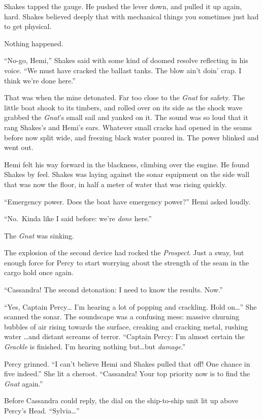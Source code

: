 \documentclass[
]{scrbook}
\begin{document}
Shakes tapped the gauge. He pushed the lever down, and pulled it up
again, hard. Shakes believed deeply that with mechanical things you
sometimes just had to get physical.

Nothing happened.

``No-go, Hemi,'' Shakes said with some kind of doomed resolve reflecting
in his voice. ``We must have cracked the ballast tanks. The blow ain't
doin' crap. I think we're done here.''

That was when the mine detonated. Far too close to the \emph{Gnat} for
safety. The little boat shook to its timbers, and rolled over on its
side as the shock wave grabbed the \emph{Gnat}'s small sail and yanked
on it. The sound was so loud that it rang Shakes's and Hemi's ears.
Whatever small cracks had opened in the seams before now split wide, and
freezing black water poured in. The power blinked and went out.

Hemi felt his way forward in the blackness, climbing over the engine. He
found Shakes by feel. Shakes was laying against the sonar equipment on
the side wall that was now the floor, in half a meter of water that was
rising quickly.

``Emergency power. Does the boat have emergency power?'' Hemi asked
loudly.

``No.~Kinda like I said before: we're \emph{done} here.''

The \emph{Gnat} was sinking.

\bigskip

The explosion of the second device had rocked the \emph{Prospect}. Just
a sway, but enough force for Percy to start worrying about the strength
of the seam in the cargo hold once again.

``Cassandra! The second detonation: I need to know the results. Now.''

``Yes, Captain Percy\ldots{} I'm hearing a lot of popping and crackling.
Hold on\ldots{}'' She scanned the sonar. The soundscape was a confusing
mess: massive churning bubbles of air rising towards the surface,
creaking and cracking metal, rushing water \ldots and distant screams of
terror. ``Captain Percy: I'm almost certain the \emph{Grackle} is
finished. I'm hearing nothing but\ldots but \emph{damage}.''

Percy grinned. ``I can't believe Hemi and Shakes pulled that off! One
chance in five indeed.'' She lit a cheroot. ``Cassandra! Your top
priority now is to find the \emph{Gnat} again.''

Before Cassandra could reply, the dial on the ship-to-ship unit lit up
above Percy's Head. ``Sylvia\ldots{}''
\end{document}
